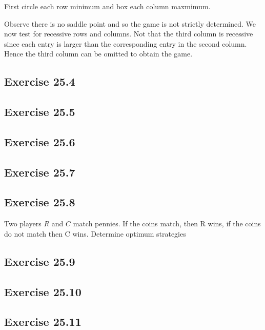 \documentclass[]{report}
\begin{document}
First circle each row minimum and box each column maxmimum.

Observe there is no saddle point and so the game is not strictly determined.
We now test for recessive rows and columns.
Not that the third column is recessive since each entry is larger than the corresponding entry in the
second column. Hence the third column can be omitted to obtain the game.


\subsection{Exercise 25.4}


\subsection{Exercise 25.5}


\subsection{Exercise 25.6}

\subsection{Exercise 25.7}



\subsection{Exercise 25.8}

Two players $R$ and $C$ match pennies. If the coins match, then R wins, if the coins
do not match then C wins. Determine optimum strategies

\subsection{Exercise 25.9}


\subsection{Exercise 25.10}


\subsection{Exercise 25.11}

\end{document}
